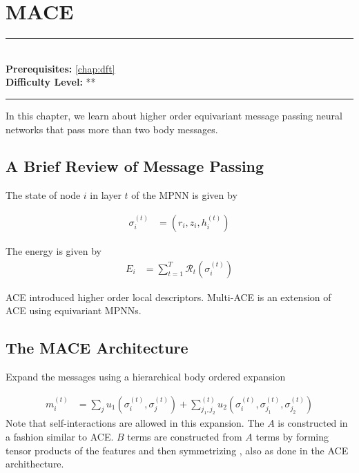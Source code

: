 \documentclass[book.tex]{subfiles}
\begin{document}
\chapter{MACE}

\label{chap:allegro}
\noindent\rule{11cm}{0.4pt} \\
\textbf{Prerequisites:} \autoref{chap:dft} \\
\textbf{Difficulty Level:} ** \\
\noindent\rule{11cm}{0.4pt}
\vspace{5mm}

In this chapter, we learn about higher order equivariant message passing neural networks that pass more than two body messages.

\section{A Brief Review of Message Passing}

The state of node $i$ in layer $t$ of the MPNN is given by

\begin{align}
\sigma_i^{(t)} &= (r_i, z_i, h_i^{(t)})
\end{align}

The energy is given by
\begin{align}
E_i &= \sum_{t=1}^T \mathcal{R}_t(\sigma_i^{(t)})
\end{align}

ACE introduced higher order local descriptors. %
Multi-ACE is an extension of ACE using equivariant MPNNs.

\section{The MACE Architecture}

Expand the messages using a hierarchical body ordered expansion

\begin{align}
m_i^{(t)} &= \sum_j u_1(\sigma_i^{(t)}, \sigma_j^{(t)}) +  \sum_{j_1, j_2}^{(t)} u_2(\sigma_i^{(t)}, \sigma_{j_1}^{(t)}, \sigma_{j_2}^{(t)})
\end{align}
Note that self-interactions are allowed in this expansion. The $A$ is constructed in a fashion similar to ACE. $B$ terms are constructed from $A$ terms by forming tensor products of the features and then symmetrizing , also as done in the ACE archithecture.
\end{document}
